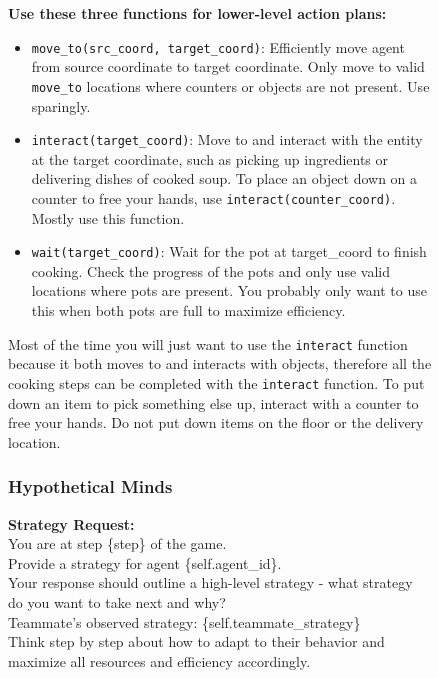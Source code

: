 \documentclass{article} %
\begin{document}
\begin{figure}[H]
\begin{tcolorbox}
\textbf{Use these three functions for lower-level action plans:}
\begin{itemize}
    \item \texttt{move\_to(src\_coord, target\_coord)}: Efficiently move agent from source coordinate to target coordinate. Only move to valid \texttt{move\_to} locations where counters or objects are not present. Use sparingly.
    \item \texttt{interact(target\_coord)}: Move to and interact with the entity at the target coordinate, such as picking up ingredients or delivering dishes of cooked soup. To place an object down on a counter to free your hands, use \texttt{interact(counter\_coord)}. Mostly use this function.
    \item \texttt{wait(target\_coord)}: Wait for the pot at target\_coord to finish cooking. Check the progress of the pots and only use valid locations where pots are present. You probably only want to use this when both pots are full to maximize efficiency.
\end{itemize}
Most of the time you will just want to use the \texttt{interact} function because it both moves to and interacts with objects, therefore all the cooking steps can be completed with the \texttt{interact} function.
To put down an item to pick something else up, interact with a counter to free your hands. Do not put down items on the floor or the delivery location.
\end{tcolorbox}

\subsubsection{Hypothetical Minds}

\begin{tcolorbox}[
    title={\small \textbf{High Level Strategy Message (in ToM Module of HM) for Collaborative Cooking Asymmetric}},
    width=\linewidth, %
    fontupper=\fontsize{9pt}{11pt}\selectfont\ttfamily
] %

\textbf{Strategy Request:}\\
You are at step \{step\} of the game.\\
Provide a strategy for agent \{self.agent\_id\}.\\
Your response should outline a high-level strategy - what strategy do you want to take next and why?\\
Teammate's observed strategy: \{self.teammate\_strategy\}\\
Think step by step about how to adapt to their behavior and maximize all resources and efficiency accordingly.


\end{tcolorbox}
\end{figure}
\end{document}
